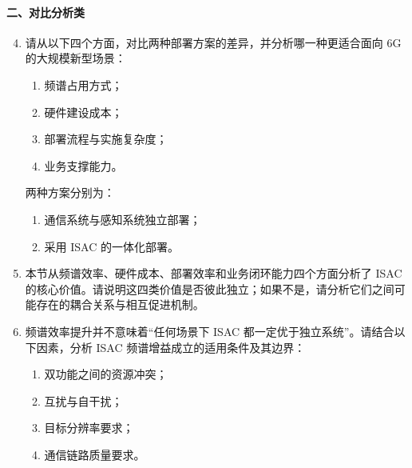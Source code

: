 \paragraph{二、对比分析类}
\begin{enumerate}
    \setcounter{enumi}{3}
    \item 请从以下四个方面，对比两种部署方案的差异，并分析哪一种更适合面向 6G 的大规模新型场景：
    \begin{enumerate}
        \item 频谱占用方式；
        \item 硬件建设成本；
        \item 部署流程与实施复杂度；
        \item 业务支撑能力。
    \end{enumerate}
    两种方案分别为：
    \begin{enumerate}
        \item 通信系统与感知系统独立部署；
        \item 采用 ISAC 的一体化部署。
    \end{enumerate}

    \item 本节从频谱效率、硬件成本、部署效率和业务闭环能力四个方面分析了 ISAC 的核心价值。请说明这四类价值是否彼此独立；如果不是，请分析它们之间可能存在的耦合关系与相互促进机制。

    \item 频谱效率提升并不意味着“任何场景下 ISAC 都一定优于独立系统”。请结合以下因素，分析 ISAC 频谱增益成立的适用条件及其边界：
    \begin{enumerate}
        \item 双功能之间的资源冲突；
        \item 互扰与自干扰；
        \item 目标分辨率要求；
        \item 通信链路质量要求。
    \end{enumerate}
\end{enumerate}

